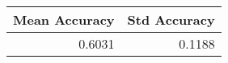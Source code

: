 \begin{tabular}{rr}
\toprule
Mean Accuracy & Std Accuracy \\
\midrule
0.6031 & 0.1188 \\
\bottomrule
\end{tabular}
